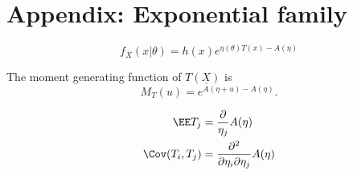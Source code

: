 \section{Appendix: Exponential family}
\begin{mydef}
	$$f_X(x|\theta) = h(x) e^{\eta(\theta) T(x) - A(\eta) }$$
\end{mydef}

\begin{prop}
	The moment generating function of $T(\underline{X})$ is 
	$$M_T(u) = e^{ A(\eta + u)  - A(\eta) }.$$
\end{prop}

\begin{cor}
	\begin{align*}
		\EE T_j & = \frac{\partial}{\eta_j} A(\eta) \\
		\Cov(T_i, T_j) & = \frac{\partial^2}{\partial \eta_i \partial \eta_j} A(\eta)
	\end{align*}
\end{cor}